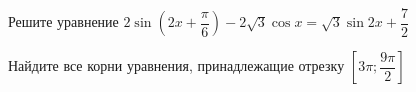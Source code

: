 \begin{ex}
	\begin{condition}
		\begin{enumcols}[label=\asbuk*)]
			\item Решите уравнение \(  2\sin{\left(2x + \dfrac{\pi}{6}\right)}- 2\sqrt{3}\cos x = \sqrt{3}\sin 2x+ \dfrac{7}{2}  \)
			\item Найдите все корни уравнения, принадлежащие отрезку \( \left[3\pi;\dfrac{9\pi}{2}\right] \)
		\end{enumcols}
	\end{condition}
\end{ex}